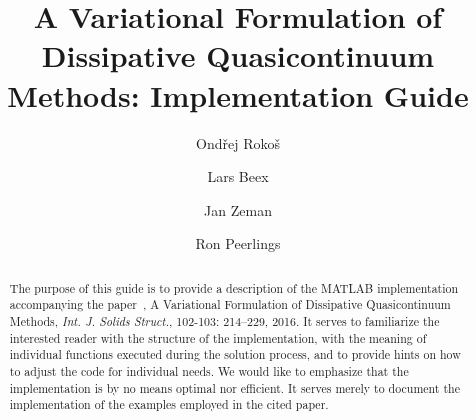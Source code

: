 \documentclass[preprint,12pt,authoryear]{elsarticle}
\begin{document}
\begin{frontmatter}



\title{A Variational Formulation of Dissipative Quasicontinuum Methods: Implementation Guide}


\author[affiliation1]{Ond\v{r}ej Roko\v{s}}

\author[affiliation2]{Lars Beex}

\author[affiliation1]{Jan Zeman}

\author[affiliation3]{Ron Peerlings}

\address[affiliation1]{Department of Mechanics, Faculty of Civil Engineering, Czech Technical University in Prague, Th\'{a}kurova~7, 166~29 Prague~6, Czech Republic.}

\address[affiliation2]{Facult\'{e} des Sciences, de la Technologie et de la Communication, Campus Kirchberg, Universit\'{e} du Luxembourg~6, rue Richard Coudenhove-Kalergi, L-1359 Luxembourg.}

\address[affiliation3]{Department of Mechanical Engineering, Eindhoven University of Technology, P.O. Box~513, 5600~MB Eindhoven, The Netherlands.}

\begin{abstract}
The purpose of this guide is to provide a description of the MATLAB\textsuperscript{\textregistered} implementation accompanying the paper~\citeauthor{RokosQC}, A Variational Formulation of Dissipative Quasicontinuum Methods, \emph{Int. J. Solids Struct.}, 102-103: 214--229, 2016. It serves to familiarize the interested reader with the structure of the implementation, with the meaning of individual functions executed during the solution process, and to provide hints on how to adjust the code for individual needs. We would like to emphasize that the implementation is by no means optimal nor efficient. It serves merely to document the implementation of the examples employed in the cited paper.
\end{abstract}


\end{frontmatter}
\end{document}
